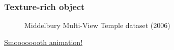 \documentclass{beamer}
\begin{document}
\begin{frame}
  \frametitle{Texture-rich object}
  \begin{figure}[htb!]
   \centering
   \caption*{\tiny Middelbury Multi-View Temple dataset (2006)}
  \end{figure}
  \href{run:./vid/13-temple-visocc.mp4}{\tiny Smoooooooth animation!} \\
\end{frame}
\end{document}
